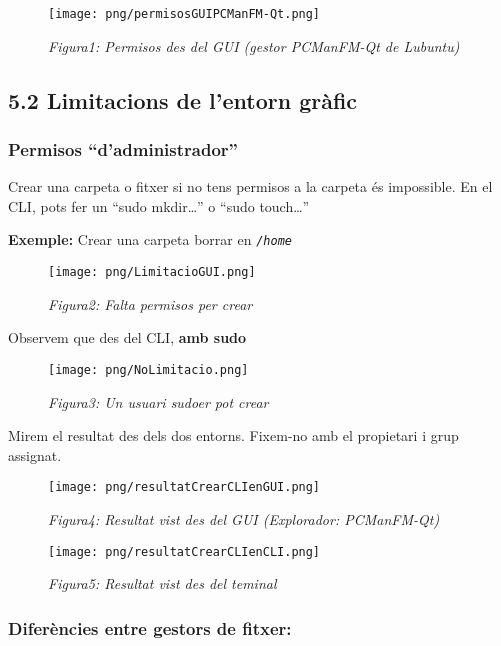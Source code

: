 \documentclass[
  a4paper,
]{article}
\begin{document}
\begin{figure}
\centering
\texttt{[image: png/permisosGUIPCManFM-Qt.png]}
\caption{\emph{Figura1: Permisos des del GUI (gestor PCManFM-Qt de
Lubuntu)}}
\end{figure}

\subsection{5.2 Limitacions de l'entorn
gràfic}\label{limitacions-de-lentorn-gruxe0fic}

\subsubsection{Permisos
``d'administrador''}\label{permisos-dadministrador}

Crear una carpeta o fitxer si no tens permisos a la carpeta és
impossible. En el CLI, pots fer un ``sudo mkdir\ldots{}'' o ``sudo
touch\ldots{}''

\textbf{Exemple:} Crear una carpeta borrar en \emph{\texttt{/home}}

\begin{figure}
\centering
\texttt{[image: png/LimitacioGUI.png]}
\caption{\emph{Figura2: Falta permisos per crear}}
\end{figure}

Observem que des del CLI, \textbf{amb sudo}

\begin{figure}
\centering
\texttt{[image: png/NoLimitacio.png]}
\caption{\emph{Figura3: Un usuari sudoer pot crear}}
\end{figure}

Mirem el resultat des dels dos entorns. Fixem-no amb el propietari i
grup assignat.

\begin{figure}
\centering
\texttt{[image: png/resultatCrearCLIenGUI.png]}
\caption{\emph{Figura4: Resultat vist des del GUI (Explorador:
PCManFM-Qt)}}
\end{figure}

\begin{figure}
\centering
\texttt{[image: png/resultatCrearCLIenCLI.png]}
\caption{\emph{Figura5: Resultat vist des del teminal}}
\end{figure}

\subsubsection{Diferències entre gestors de
fitxer:}\label{diferuxe8ncies-entre-gestors-de-fitxer}
\end{document}
